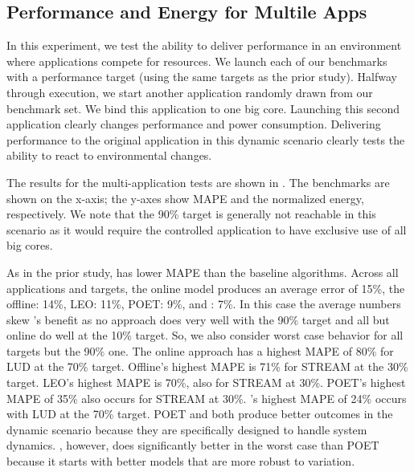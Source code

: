



\subsection{Performance and Energy for Multile Apps}
In this experiment, we test the ability to deliver performance in an
environment where applications compete for resources.  We launch each
of our benchmarks with a performance target (using the same targets as
the prior study).  Halfway through execution, we start another
application randomly drawn from our benchmark set.  We bind this
application to one big core.  Launching this second application
clearly changes performance and power consumption.  Delivering
performance to the original application in this dynamic scenario
clearly tests the ability to react to environmental changes.

The results for the multi-application tests are shown in
.  The benchmarks are shown on the
x-axis; the y-axes show MAPE and the normalized energy, respectively.
We note that the 90\% target is generally not reachable in this
scenario as it would require the controlled application to have
exclusive use of all big cores.


As in the prior study, \SYSTEM{} has lower MAPE than the baseline
algorithms. Across all applications and targets, the online model
produces an average error of 15\%, the offline: 14\%, LEO: 11\%, POET:
9\%, and \SYSTEM{}: 7\%.  In this case the average numbers skew
\SYSTEM{}'s benefit as no approach does very well with the 90\% target
and all but online do well at the 10\% target.  So, we also consider
worst case behavior for all targets but the 90\% one.  The online
approach has a highest MAPE of 80\% for LUD at the 70\% target.
Offline's highest MAPE is 71\% for STREAM at the 30\% target.  LEO's
highest MAPE is 70\%, also for STREAM at 30\%. POET's highest MAPE of
35\% also occurs for STREAM at 30\%.  \SYSTEM{}'s highest MAPE of 24\%
occurs with LUD at the 70\% target.  POET and \SYSTEM{} both produce
better outcomes in the dynamic scenario because they are specifically
designed to handle system dynamics.  \SYSTEM{}, however, does
significantly better in the worst case than POET because it starts
with better models that are more robust to variation.

